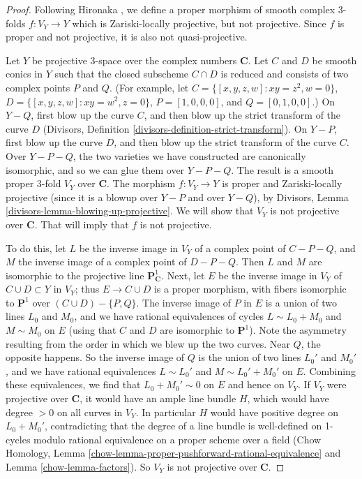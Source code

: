 \begin{proof}
Following Hironaka \cite[Example B.3.4.1]{H},
we define a proper morphism of smooth complex 3-folds
$f:V_Y\to Y$
which is Zariski-locally projective, but not projective. Since $f$ is proper
and not projective, it is also not quasi-projective.

\medskip\noindent
Let $Y$ be projective 3-space over the complex numbers ${\mathbf C}$.
Let $C$ and $D$ be smooth conics in $Y$ such
that the closed subscheme $C\cap D$ is reduced and consists
of two complex points $P$ and $Q$. (For example,
let $C=\{ [x,y,z,w]: xy=z^2, w=0\}$, $D=\{ [x,y,z,w]:
xy=w^2, z=0\}$, $P=[1,0,0,0]$,
and $Q=[0,1,0,0]$.) 
On $Y-Q$, first blow up the curve $C$, and then blow
up the strict transform of the curve $D$ (Divisors, Definition 
\ref{divisors-definition-strict-transform}). On $Y-P$, first blow up
the curve $D$, and then blow up the strict transform of the curve
$C$. Over $Y-P-Q$, the two varieties we have constructed are canonically
isomorphic, and so we can glue them over $Y-P-Q$. The result
is a smooth proper 3-fold $V_Y$ over ${\mathbf C}$. The morphism
$f:V_Y\to Y$ is proper and Zariski-locally projective (since
it is a blowup over $Y-P$ and over $Y-Q$), by Divisors,
Lemma \ref{divisors-lemma-blowing-up-projective}. We will show that
$V_Y$ is not projective over ${\mathbf C}$. That will imply that
$f$ is not projective.

\medskip\noindent
To do this, let $L$ be the inverse image in $V_Y$ of a complex point
of $C-P-Q$, and $M$ the inverse image of a complex point of $D-P-Q$.
Then $L$ and $M$ are isomorphic to the projective line
${\mathbf P}^1_{{\mathbf C}}$. 
Next, let $E$ be the inverse image in $V_Y$ of $C\cup D\subset Y$ in $V_Y$;
thus $E\rightarrow C\cup D$ is a proper morphism, with fibers
isomorphic to ${\mathbf P}^1$ over $(C\cup D)-\{P,Q\}$.
The inverse
image of $P$ in $E$ is a union of two lines $L_0$ and $M_0$, and we have
rational equivalences of cycles $L\sim L_0+M_0$ and $M\sim M_0$ on $E$
(using that $C$ and $D$ are isomorphic to ${\mathbf P}^1$).
Note the asymmetry resulting from the order in which we blew
up the two curves. Near $Q$, the opposite happens. So the inverse image
of $Q$ is the union of two lines $L_0'$ and $M_0'$, and we have
rational equivalences $L\sim L_0'$ and $M\sim L_0'+M_0'$ on $E$.
Combining these equivalences, we find that $L_0+M_0'\sim 0$
on $E$ and hence on $V_Y$. If $V_Y$ were projective over ${\mathbf C}$,
it would have
an ample line bundle $H$, which would have degree $>0$ on all curves
in $V_Y$. In particular $H$ would have positive degree on $L_0+M_0'$,
contradicting that the degree of a line bundle is well-defined
on 1-cycles modulo rational equivalence on a proper scheme
over a field (Chow Homology,
Lemma \ref{chow-lemma-proper-pushforward-rational-equivalence}
and Lemma \ref{chow-lemma-factors}).
So $V_Y$ is not projective over ${\mathbf C}$.
\end{proof}

